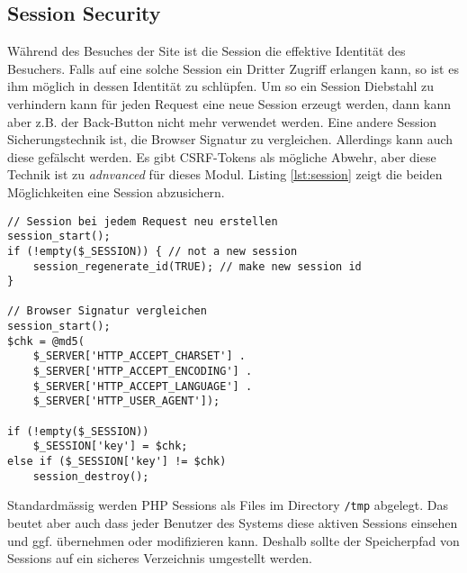 \subsection{Session Security}

Während des Besuches der Site ist die Session die effektive Identität des Besuchers. Falls auf eine solche Session ein Dritter Zugriff erlangen kann, so ist es ihm möglich in dessen Identität zu schlüpfen. Um so ein Session Diebstahl zu verhindern kann für jeden Request eine neue Session erzeugt werden, dann kann aber z.B. der Back-Button nicht mehr verwendet werden. Eine andere Session Sicherungstechnik ist, die Browser Signatur zu vergleichen. Allerdings kann auch diese gefälscht werden. Es gibt CSRF-Tokens als mögliche Abwehr, aber diese Technik ist zu \textit{adnvanced} für dieses Modul. Listing \ref{lst:session} zeigt die beiden Möglichkeiten eine Session abzusichern.

\begin{lstlisting}[caption=Session absichern, label=lst:session]
// Session bei jedem Request neu erstellen
session_start();
if (!empty($_SESSION)) { // not a new session
	session_regenerate_id(TRUE); // make new session id
}

// Browser Signatur vergleichen
session_start();
$chk = @md5(
	$_SERVER['HTTP_ACCEPT_CHARSET'] .
	$_SERVER['HTTP_ACCEPT_ENCODING'] .
	$_SERVER['HTTP_ACCEPT_LANGUAGE'] .
	$_SERVER['HTTP_USER_AGENT']);

if (!empty($_SESSION))
	$_SESSION['key'] = $chk;
else if ($_SESSION['key'] != $chk)
	session_destroy();
\end{lstlisting}

Standardmässig werden PHP Sessions als Files im Directory \verb|/tmp| abgelegt. Das beutet aber auch dass jeder Benutzer des Systems diese aktiven Sessions einsehen und ggf. übernehmen oder modifizieren kann. Deshalb sollte der Speicherpfad von Sessions auf ein sicheres Verzeichnis umgestellt werden.